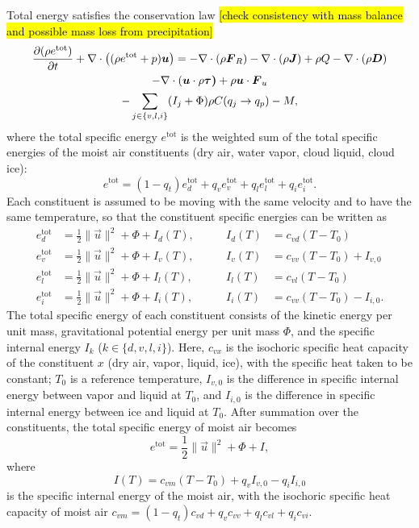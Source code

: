 \documentclass{article}
\begin{document}
Total energy satisfies the conservation law \citep{Romps08a} \hl{[check consistency with mass balance and possible mass loss from precipitation]}
\begin{multline}
 \frac{\partial (\rho e^\mathrm{tot})}{\partial t} + \nabla \cdot \left( (\rho e^\mathrm{tot} + p)\boldsymbol{{u}} \right)
 = -\nabla \cdot (\rho \boldsymbol{{F}}_R) - \nabla \cdot (\rho \boldsymbol{{J}}) + \rho Q - \nabla \cdot (\rho \boldsymbol{{D}})  \\
  - \nabla \cdot (\boldsymbol{{u}} \cdot \rho\boldsymbol{{\tau)}} + \rho \boldsymbol{{u}} \cdot \boldsymbol{{F}}_u \\
   - \sum_{j\in\{v,l,i\}}(I_j + \Phi)  \rho C(q_j \rightarrow q_p) - M,
 \label{eq:energy_balance}
\end{multline}
where the total specific energy $e^{\mathrm{tot}}$ is the weighted sum of the total specific energies of the moist air constituents (dry air, water vapor, cloud liquid, cloud ice):
\begin{equation}
    e^{\mathrm{tot}} = (1-q_t) e_d^{\mathrm{tot}} + q_v e_v^{\mathrm{tot}} + q_l e_l^{\mathrm{tot}} + q_i e_i^{\mathrm{tot}}.
\end{equation}
Each constituent is assumed to be moving with the same velocity and to have the same temperature, so that the constituent specific energies can be written as
\begin{align}
e_d^{\mathrm{tot}} & = \frac{1}{2} \| \vec{u} \|^2 + \Phi + I_d(T), \qquad & I_d(T) & = c_{vd} (T - T_0)  \\
e_v^{\mathrm{tot}} & = \frac{1}{2} \| \vec{u} \|^2 + \Phi + I_v(T), \qquad & I_v(T) & = c_{vv} (T - T_0) + I_{v,0}\\
e_l^{\mathrm{tot}} & = \frac{1}{2} \| \vec{u} \|^2 + \Phi + I_l(T), \qquad & I_l(T) & = c_{vl} (T - T_0) \\
e_i^{\mathrm{tot}} & = \frac{1}{2} \| \vec{u} \|^2 + \Phi + I_i(T), \qquad & I_i(T) & = c_{vv} (T - T_0)  - I_{i,0}.
\end{align}
The total specific energy of each constituent consists of the kinetic energy per unit mass, gravitational potential energy per unit mass $\Phi$, and the specific internal energy $I_k$ ($k \in \{d, v, l, i\}$). Here, $c_{vx}$ is the isochoric specific heat capacity of the constituent $x$ (dry air, vapor, liquid, ice), with the specific heat taken to be constant;  $T_0$ is a reference temperature, $I_{v,0}$ is the difference in specific internal energy between vapor and liquid at $T_0$, and $I_{i,0}$ is the difference in specific internal energy between ice and liquid at $T_0$. After summation over the constituents, the total specific energy of moist air becomes
\begin{equation}
     e^{\mathrm{tot}} = \frac{1}{2} \| \vec{u} \|^2 + \Phi + I,
     \label{eq:total_energy_def}
\end{equation}
where 
\begin{equation}
     I(T) = c_{vm} (T - T_0)  + q_v I_{v,0} - q_i I_{i,0}
     \label{eq:total_internal_energy}
\end{equation}
is the specific internal energy of the moist air, with the isochoric specific heat capacity of moist air $c_{vm} = (1-q_t) c_{vd} + q_v c_{vv} + q_l c_{vl} + q_i c_{vi}$.
\end{document}
